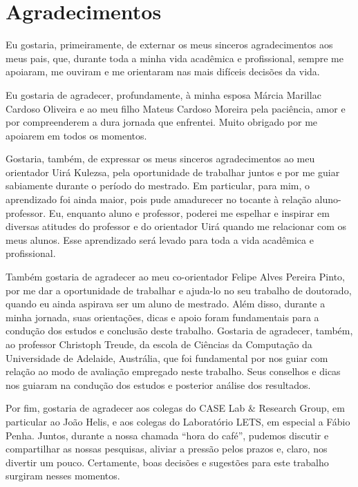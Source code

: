 
\chapter*{Agradecimentos}

Eu gostaria, primeiramente, de externar os meus sinceros agradecimentos aos meus pais, que, durante toda a minha vida acadêmica e profissional, sempre me apoiaram, me ouviram e me orientaram nas mais difíceis decisões da vida.

Eu gostaria de agradecer, profundamente, à minha esposa Márcia Marillac Cardoso Oliveira e ao meu filho Mateus Cardoso Moreira pela paciência, amor e por compreenderem a dura jornada que enfrentei. Muito obrigado por me apoiarem em todos os momentos.

Gostaria, também, de expressar os meus sinceros agradecimentos ao meu orientador Uirá Kulezsa, pela oportunidade de trabalhar juntos e por me guiar sabiamente durante o período do mestrado. Em particular, para mim, o aprendizado foi ainda maior, pois pude amadurecer no tocante à relação aluno-professor. Eu, enquanto aluno e professor, poderei me espelhar e inspirar em diversas atitudes do professor e do orientador Uirá quando me relacionar com os meus alunos. Esse aprendizado será levado para toda a vida acadêmica e profissional.

Também gostaria de agradecer ao meu co-orientador Felipe Alves Pereira Pinto, por me dar a oportunidade de trabalhar e ajuda-lo no seu trabalho de doutorado, quando eu ainda aspirava ser um aluno de mestrado. Além disso, durante a minha jornada, suas orientações, dicas e apoio foram fundamentais para a condução dos estudos e conclusão deste trabalho. Gostaria de agradecer, também, ao professor Christoph Treude, da escola de Ciências da Computação da Universidade de Adelaide, Austrália, que foi fundamental por nos guiar com relação ao modo de avaliação empregado neste trabalho. Seus conselhos e dicas nos guiaram na condução dos estudos e posterior análise dos resultados.

Por fim, gostaria de agradecer aos colegas do CASE Lab \& Research Group, em particular ao João Helis, e aos colegas do Laboratório LETS, em especial a Fábio Penha. Juntos, durante a nossa chamada ``hora do café'', pudemos discutir e compartilhar as nossas pesquisas, aliviar a pressão pelos prazos e, claro, nos divertir um pouco. Certamente, boas decisões e sugestões para este trabalho surgiram nesses momentos.